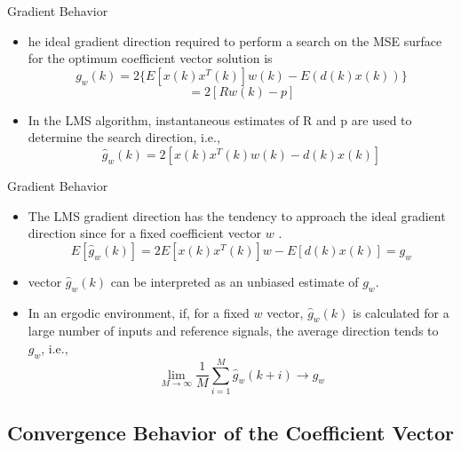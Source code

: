 \documentclass{beamer}
\begin{document}
\begin{frame}{Gradient Behavior}
    \begin{itemize}
        \item he ideal gradient direction required to perform a search on the MSE surface for the optimum coefficient vector solution is
        \begin{equation*}
            g_w(k) = 2\{E[x(k)x^T(k)]w(k)-E(d(k)x(k))\}
        \end{equation*}
        \begin{equation}
        =2[Rw(k)-p]
        \end{equation}
        \item In the LMS algorithm, instantaneous estimates of R and p are used to determine the search direction, i.e.,
        \begin{equation}
            \hat{g}_w(k)=2[x(k)x^T(k)w(k)-d(k)x(k)]
        \end{equation}
    \end{itemize}
\end{frame}

\begin{frame}{Gradient Behavior}
    \begin{itemize}
        \item The LMS gradient direction has the tendency to approach the ideal gradient direction since for a fixed coefficient vector $ w $ .
        \begin{equation}
            E[\hat{g}_w(k)]=2{E[x(k)x^T(k)]w - E[d(k)x(k)]}=g_w
        \end{equation}
        \item vector $\hat{g}_w(k)$ can be interpreted as an unbiased estimate of $g_w$.
        \item In an ergodic environment, if, for a fixed $w$ vector, $\hat{g}_w(k)$ is calculated for a large number of inputs and reference signals, the average direction tends to $g_w$, i.e.,
        \begin{equation}
            \mathop{lim}\limits_{M \rightarrow \infty}\frac{1}{M}\sum\limits_{i=1}^{M}\hat{g}_w(k+i)\rightarrow g_w
        \end{equation}
    \end{itemize}
\end{frame}

\subsection{Convergence Behavior of the Coefficient Vector}
\end{document}
